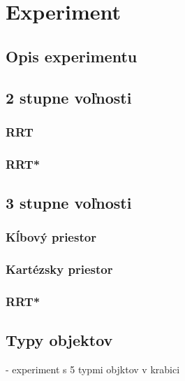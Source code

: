 \section{Experiment}
\label{kap:5}

\subsection{Opis experimentu}

\subsection{2 stupne voľnosti}
\subsubsection{RRT}
\subsubsection{RRT*}

\subsection{3 stupne voľnosti}

\subsubsection{Kĺbový priestor}
\subsubsection{Kartézsky priestor}
\subsubsection{RRT*}

\subsection{Typy objektov}
- experiment s 5 typmi objktov v krabici